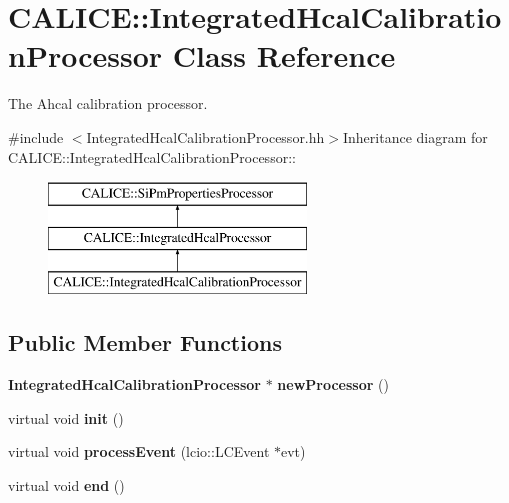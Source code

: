 \section{CALICE::IntegratedHcalCalibrationProcessor Class Reference}
\label{classCALICE_1_1IntegratedHcalCalibrationProcessor}


The Ahcal calibration processor.  


{\ttfamily \#include $<$IntegratedHcalCalibrationProcessor.hh$>$}Inheritance diagram for CALICE::IntegratedHcalCalibrationProcessor::\begin{figure}[H]
\begin{center}
\leavevmode
\includegraphics[height=3cm]{classCALICE_1_1IntegratedHcalCalibrationProcessor}
\end{center}
\end{figure}
\subsection*{Public Member Functions}
\begin{DoxyCompactItemize}
\item 
{\bf IntegratedHcalCalibrationProcessor} $\ast$ {\bfseries newProcessor} ()\label{classCALICE_1_1IntegratedHcalCalibrationProcessor_a598bbbd1a328ce27442d3a9d026b9867}

\item 
virtual void {\bfseries init} ()\label{classCALICE_1_1IntegratedHcalCalibrationProcessor_afcb4ac8fef8a5bcc1fd5ae4b8620af85}

\item 
virtual void {\bfseries processEvent} (lcio::LCEvent $\ast$evt)\label{classCALICE_1_1IntegratedHcalCalibrationProcessor_ae95a64ab3b6bbbd9b239f41f7d6c98c3}

\item 
virtual void {\bfseries end} ()\label{classCALICE_1_1IntegratedHcalCalibrationProcessor_a8f73d365b94979a80808dc903cfc9c00}

\end{DoxyCompactItemize}
